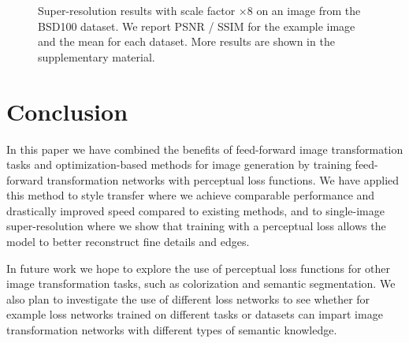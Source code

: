 \documentclass[runningheads]{llncs}
\begin{document}
\begin{figure}[t]
  \vspace{-2mm}
  \caption{Super-resolution results with scale factor $\times8$ on an image from the
    BSD100 dataset. We report PSNR / SSIM for the example image and the mean
    for each dataset. More results are shown in the supplementary material.
  }
  \vspace{-4mm}
  \label{fig:SR-8x-results}
\end{figure}

\vspace{-2mm}
\section{Conclusion}
\vspace{-2mm}
In this paper we have combined the benefits of feed-forward image transformation tasks and
optimization-based methods for image generation by training feed-forward transformation networks
with perceptual loss functions. We have applied this method to style transfer where we achieve
comparable performance and drastically improved speed compared to existing methods, and to
single-image super-resolution where we show that training with a perceptual loss allows the model
to better reconstruct fine details and edges.

In future work we hope to explore the use of perceptual loss functions for other image transformation
tasks, such as colorization and semantic segmentation. We also plan to investigate the use of different
loss networks to see whether for example loss networks trained on different tasks or datasets can
impart image transformation networks with different types of semantic knowledge.


\clearpage

 
\end{document}
